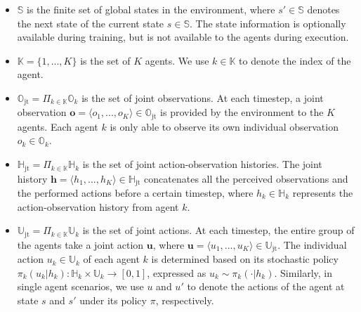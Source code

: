 \documentclass[twoside,11pt]{article}
\newcommand{\statespace}{\mathbb{S}}
\newcommand{\state}{s}
\newcommand{\jointactionspace}{\mathbb{U}}
\newcommand{\jointaction}{\mathbf{u}}
\newcommand{\action}{u}
\newcommand{\jointobservationspace}{\mathbb{O}}
\newcommand{\jointobservation}{\mathbf{o}}
\newcommand{\observation}{o}
\newcommand{\jointobservationhistoryspace}{\mathbb{H}}
\newcommand{\jointobservationhistory}{\mathbf{h}}
\newcommand{\observationhistory}{h}
\newcommand{\agentspace}{\mathbb{K}}
\newcommand{\agentcounter}{k}
\newcommand{\numberofagents}{K}
\newcommand{\policy}{\pi}
\newcommand{\joint}{\mathrm{jt}}
\begin{document}
\begin{itemize}
\setlength\itemsep{0em}

\item $\statespace{}$ is the finite set of global states in the environment, where $\state{}'\in \statespace{}$ denotes the next state of the current state $\state{}\in \statespace{}$. The state information is optionally available during training, but is not available to the agents during execution.

\item $\agentspace{}=\{1,...,\numberofagents{}\}$ is the set of $\numberofagents{}$ agents. We use $\agentcounter{}\in\agentspace{}$ to denote the index of the agent.

\item $\jointobservationspace_{\joint}=\Pi_{\agentcounter{}\in\agentspace{}}\jointobservationspace{}_{\agentcounter{}}$ is the set of joint observations. At each timestep, a joint observation $\jointobservation{}=\langle\observation{}_1,...,\observation{}_\numberofagents{}\rangle\in\jointobservationspace_{\joint}$ is provided by the environment to the $\numberofagents{}$ agents. Each agent $\agentcounter{}$ is only able to observe its own individual observation $\observation{}_{\agentcounter{}}\in\jointobservationspace{}_{\agentcounter{}}$.

\item $\jointobservationhistoryspace_{\joint}=\Pi_{\agentcounter{}\in\agentspace{}}\jointobservationhistoryspace{}_{\agentcounter{}}$ is the set of joint action-observation histories. The joint history $\jointobservationhistory{}=\langle\observationhistory{}_1,...,\observationhistory{}_\numberofagents{}\rangle\in\jointobservationhistoryspace_{\joint}$ concatenates all the perceived observations and the performed actions before a certain timestep, where $\observationhistory{}_{\agentcounter{}}\in\jointobservationhistoryspace{}_{\agentcounter{}}$ represents the action-observation history from agent $\agentcounter{}$.

\item $\jointactionspace_{\joint}=\Pi_{\agentcounter{}\in\agentspace{}}\jointactionspace{}_{\agentcounter{}}$ is the set of joint actions. At each timestep, the entire group of the agents take a joint action $\jointaction{}$, where $\jointaction{}=\langle\action{}_1,...,\action{}_{\numberofagents{}}\rangle\in\jointactionspace_{\joint}$. The individual action $\action{}_{\agentcounter{}}\in\jointactionspace_{\agentcounter{}}$ of each agent $\agentcounter{}$ is determined based on its stochastic policy $\policy{}_{\agentcounter{}}(\action{}_{\agentcounter{}}|\observationhistory{}_{\agentcounter{}}): \jointobservationhistoryspace{}_{\agentcounter{}}\times \jointactionspace{}_{\agentcounter{}}\rightarrow[0,1]$, expressed as $\action{}_{\agentcounter{}}\sim\policy{}_{\agentcounter{}}(\cdot|\observationhistory{}_{\agentcounter{}})$. Similarly, in single agent scenarios, we use $\action$ and $\action'$ to denote the actions of the agent at state $\state$ and $\state'$ under its policy $\policy$, respectively.


\end{itemize}
\end{document}
